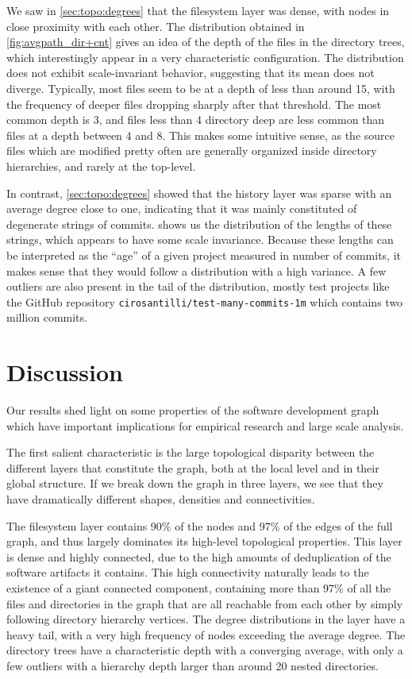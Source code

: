 We saw in \cref{sec:topo:degrees} that the filesystem layer was dense,
with nodes in close proximity with each other.  The distribution obtained in
\cref{fig:avgpath_dir+cnt} gives an idea of the depth of the files in the
directory trees, which interestingly appear in a very characteristic
configuration. The distribution does not exhibit scale-invariant behavior,
suggesting that its mean does not diverge.  Typically, most files seem to be at
a depth of less than around 15, with the frequency of deeper files dropping
sharply after that threshold.  The most common depth is 3, and files less than
4 directory deep are less common than files at a depth between 4 and 8. This
makes some intuitive sense, as the source files which are modified pretty often
are generally organized inside directory hierarchies, and rarely at the
top-level.

In contrast, \cref{sec:topo:degrees} showed that the history layer was
sparse with an average degree close to one, indicating that it was mainly
constituted of degenerate strings of commits.  shows us
the distribution of the lengths of these strings, which appears to have some
scale invariance. Because these lengths can be interpreted as the ``age'' of a
given project measured in number of commits, it makes sense that they would
follow a distribution with a high variance.
A few outliers are also present in the tail of the distribution, mostly test
projects like the GitHub repository \texttt{cirosantilli/test-many-commits-1m}
which contains two million commits.

\section{Discussion}
\label{sec:topology-discussion}

Our results shed light on some properties of the software development graph
which have important implications for empirical research and large scale
analysis.

The first salient characteristic is the large topological disparity between the
different layers that constitute the graph, both at the local level and in
their global structure. If we break down the graph in three layers, we see that
they have dramatically different shapes, densities and connectivities.

The filesystem layer contains 90\% of the nodes and 97\% of the edges of the
full graph, and thus largely dominates its high-level topological properties.
This layer is dense and highly connected, due to the high amounts of
deduplication of the software artifacts it contains. This high connectivity
naturally leads to the existence of a giant connected component, containing
more than 97\% of all the files and directories in the graph that are all
reachable from each other by simply following directory hierarchy vertices.
The degree distributions in the layer have a heavy tail, with a very high
frequency of nodes exceeding the average degree.
The directory trees have a characteristic depth with a converging average, with
only a few outliers with a hierarchy depth larger than around 20 nested
directories.

